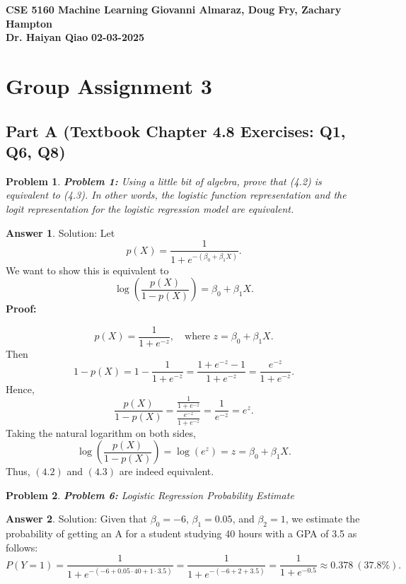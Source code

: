 \documentclass[12pt]{article}
\newtheorem{problem}{Problem} %
\theoremstyle{definition}
\newtheorem*{answer}{Answer}
\newcommand{\solution}{\textcolor{PineGreen}{Solution:\newline}}
\begin{document}
\begin{center}
\textbf{CSE 5160 Machine Learning} \hfill \textbf{Giovanni Almaraz, Doug Fry, Zachary Hampton}\\
\textbf{Dr. Haiyan Qiao} \hfill \textbf{02-03-2025}
\end{center}

\bigskip

\section*{Group Assignment 3}

\subsection*{Part A (Textbook Chapter 4.8 Exercises: Q1, Q6, Q8)}

\begin{problem}
\textbf{Problem 1:} Using a little bit of algebra, prove that (4.2) is equivalent to (4.3). In other words, the logistic function representation and the logit representation for the logistic regression model are equivalent.
\end{problem}

\begin{answer}
\solution
Let 
\[
p(X) = \frac{1}{1 + e^{-(\beta_0 + \beta_1 X)}}.
\]
We want to show this is equivalent to
\[
\log\left(\frac{p(X)}{1 - p(X)}\right) = \beta_0 + \beta_1 X.
\]
\textbf{Proof:}

\[
p(X) = \frac{1}{1 + e^{-z}}, \quad \text{where } z = \beta_0 + \beta_1 X.
\]
Then
\[
1 - p(X) 
= 1 - \frac{1}{1 + e^{-z}}
= \frac{1 + e^{-z} - 1}{1 + e^{-z}}
= \frac{e^{-z}}{1 + e^{-z}}.
\]
Hence,
\[
\frac{p(X)}{1 - p(X)} 
= \frac{\frac{1}{1 + e^{-z}}}{\frac{e^{-z}}{1 + e^{-z}}}
= \frac{1}{e^{-z}} 
= e^z.
\]
Taking the natural logarithm on both sides,
\[
\log\left(\frac{p(X)}{1 - p(X)}\right) = \log(e^z) = z = \beta_0 + \beta_1 X.
\]
Thus, \((4.2)\) and \((4.3)\) are indeed equivalent.
\end{answer}

\setcounter{problem}{5}
\begin{problem}
\textbf{Problem 6:} Logistic Regression Probability Estimate
\end{problem}

\begin{answer}
\solution
Given that \(\beta_0 = -6\), \(\beta_1 = 0.05\), and \(\beta_2 = 1\), we estimate the probability of getting an A for a student studying 40 hours with a GPA of 3.5 as follows:
\[
    P(Y=1) 
    = \frac{1}{1 + e^{-(-6 + 0.05 \cdot 40 + 1 \cdot 3.5)}} 
    = \frac{1}{1 + e^{-(-6 + 2 + 3.5)}} 
    = \frac{1}{1 + e^{-0.5}} 
    \approx 0.378 \ (\text{37.8\%}).
\]
\end{answer}
\end{document}
